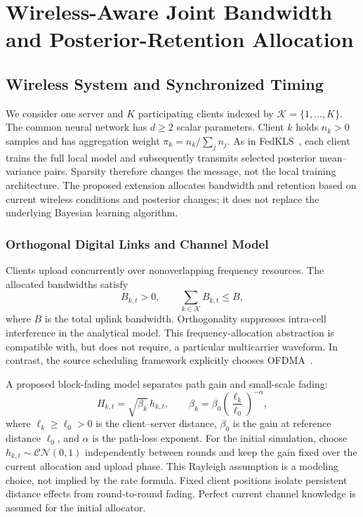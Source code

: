 \section{Wireless-Aware Joint Bandwidth and Posterior-Retention Allocation}
\label{sec:fedkls-wireless}
\subsection{Wireless System and Synchronized Timing}
\label{fkl:sec:system}
We consider one server and $K$ participating clients indexed by $\mathcal K=\{1,\ldots,K\}$. The common neural network has $d\ge2$ scalar parameters. Client $k$ holds $n_k>0$ samples and has aggregation weight $\pi_k=n_k/\sum_j n_j$. As in FedKLS~\cite{fedkls}, each client trains the full local model and subsequently transmits selected posterior mean--variance pairs. Sparsity therefore changes the message, not the local training architecture. The proposed extension allocates bandwidth and retention based on current wireless conditions and posterior changes; it does not replace the underlying Bayesian learning algorithm.

\subsubsection{Orthogonal Digital Links and Channel Model}
Clients upload concurrently over nonoverlapping frequency resources. The allocated bandwidths satisfy
\begin{equation}
 B_{k,t}>0,\qquad \sum_{k\in\mathcal K}B_{k,t}\le B,
 \label{fkl:eq:bandwidth-budget}
\end{equation}
where $B$ is the total uplink bandwidth. Orthogonality suppresses intra-cell interference in the analytical model. This frequency-allocation abstraction is compatible with, but does not require, a particular multicarrier waveform. In contrast, the source scheduling framework explicitly chooses OFDMA~\cite[Sec.~II-C]{scheduling}.

A proposed block-fading model separates path gain and small-scale fading:
\begin{equation}
 H_{k,t}=\sqrt{\beta_k}\,h_{k,t},\qquad
 \beta_k=\beta_0\left(\frac{\ell_k}{\ell_0}\right)^{-\alpha},
 \label{fkl:eq:channel}
\end{equation}
where $\ell_k\ge\ell_0>0$ is the client--server distance, $\beta_0$ is the gain at reference distance $\ell_0$, and $\alpha$ is the path-loss exponent. For the initial simulation, choose $h_{k,t}\sim\mathcal{CN}(0,1)$ independently between rounds and keep the gain fixed over the current allocation and upload phase. This Rayleigh assumption is a modeling choice, not implied by the rate formula. Fixed client positions isolate persistent distance effects from round-to-round fading. Perfect current channel knowledge is assumed for the initial allocator.

